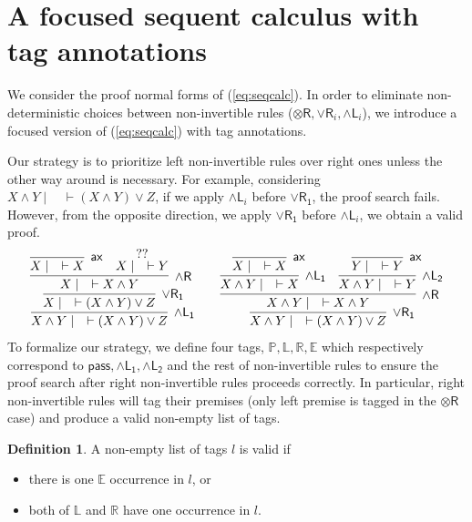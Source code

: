 \documentclass[submission,copyright,creativecommons]{eptcs}
\theoremstyle{definition}
\newtheorem{defn}{Definition}[section]
\newcommand{\tr}{\otimes \mathsf{R}}
\newcommand{\pass}{\mathsf{pass}}
\newcommand{\andlone}{\land \mathsf{L_{1}}}
\newcommand{\andltwo}{\land \mathsf{L_{2}}}
\newcommand{\andli}{\land \mathsf{L}_{i}}
\newcommand{\andr}{\land \mathsf{R}}
\newcommand{\orrone}{\lor \mathsf{R_{1}}}
\newcommand{\orri}{\lor \mathsf{R}_{i}}
\newcommand{\ax}{\mathsf{ax}}
\newcommand{\tP}{\mathbb{P}}
\newcommand{\tL}{\mathbb{L}}
\newcommand{\tR}{\mathbb{R}}
\newcommand{\tE}{\mathbb{E}}
\begin{document}
\section{A focused sequent calculus with tag annotations}
We consider the proof normal forms of (\ref{eq:seqcalc}).
In order to eliminate non-deterministic choices between non-invertible rules ($\tr , \orri , \andli$), we introduce a focused version of (\ref{eq:seqcalc}) with tag annotations.

Our strategy is to prioritize left non-invertible rules over right ones unless the other way around is necessary.
For example, considering $X \land Y \mid \quad \vdash (X \land Y) \lor Z$, if we apply $\andli$ before $\orrone$, the proof search fails.
However, from the opposite direction, we apply $\orrone$ before $\andli$, we obtain a valid proof.
\begin{equation}\label{eq:ex:focused}
  \begin{array}{c}
    \infer[\andlone]{X \land Y \mid \quad \vdash (X \land Y) \lor Z}{
      \infer[\orrone]{X \mid \quad \vdash (X \land Y) \lor Z}
      {
         \infer[\andr]{X \mid \quad \vdash X \land Y}{
           \infer[\ax]{X \mid \quad \vdash X}{}
           &
           \deduce{X \mid \quad \vdash Y}{??}
         }
      }
     }
     \qquad
     \infer[\orrone]{X \land Y \mid \quad \vdash (X \land Y) \lor Z}{
      \infer[\andr]{X \land Y \mid \quad \vdash X \land Y}{
        \infer[\andlone]{X \land Y \mid \quad \vdash X}{
          \infer[\ax]{X \mid \quad \vdash X}{}
        }
        &
        \infer[\andltwo]{X \land Y \mid \quad \vdash Y}{
          \infer[\ax]{Y \mid \quad \vdash Y}{}
        }
      }
    }
  \end{array}
\end{equation}
To formalize our strategy, we define four tags, $\tP , \tL , \tR , \tE$ which respectively correspond to $\pass , \andlone , \andltwo$ and the rest of non-invertible rules to ensure the proof search after right non-invertible rules proceeds correctly.
In particular, right non-invertible rules will tag their premises (only left premise is tagged in the $\tr$ case) and produce a valid non-empty list of tags.
\begin{defn}\label{tag:validity}
  A non-empty list of tags $l$ is valid if 
  \begin{itemize}
    \item there is one $\tE$ occurrence in $l$, or
    \item both of $\tL$ and $\tR$ have one occurrence in $l$.
  \end{itemize}
\end{defn}
\end{document}
